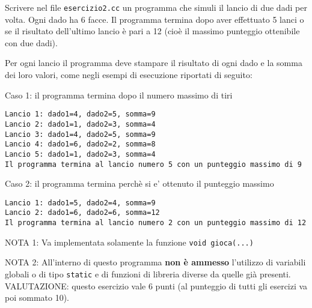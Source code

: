 %

Scrivere nel file {\tt esercizio2.cc} un programma che simuli il lancio di due dadi per volta. Ogni dado ha 6 facce. Il programma termina dopo aver effettuato 5 lanci o se il risultato dell'ultimo lancio \`e pari a 12 (cio\`e il massimo punteggio ottenibile con due dadi).

Per ogni lancio il programma deve stampare il risultato di ogni dado e la somma dei loro valori, come negli esempi di esecuzione riportati di seguito:

Caso 1: il programma termina dopo il numero massimo di tiri
\begin{verbatim}
Lancio 1: dado1=4, dado2=5, somma=9
Lancio 2: dado1=1, dado2=3, somma=4
Lancio 3: dado1=4, dado2=5, somma=9
Lancio 4: dado1=6, dado2=2, somma=8
Lancio 5: dado1=1, dado2=3, somma=4
Il programma termina al lancio numero 5 con un punteggio massimo di 9
\end{verbatim}

Caso 2: il programma termina perch\`e si e' ottenuto il punteggio massimo
\begin{verbatim}
Lancio 1: dado1=5, dado2=4, somma=9
Lancio 2: dado1=6, dado2=6, somma=12
Il programma termina al lancio numero 2 con un punteggio massimo di 12
\end{verbatim}

\vspace{.5cm}

NOTA 1: Va implementata solamente la funzione \verb|void gioca(...)|

NOTA 2: All'interno di questo programma {\bf non \`e ammesso} 
l'utilizzo di variabili globali o di tipo {\tt static} e di 
funzioni di libreria diverse da quelle gi\`a presenti. \\

VALUTAZIONE:
questo esercizio vale 6 punti (al punteggio di tutti gli esercizi va poi sommato 10).

%


